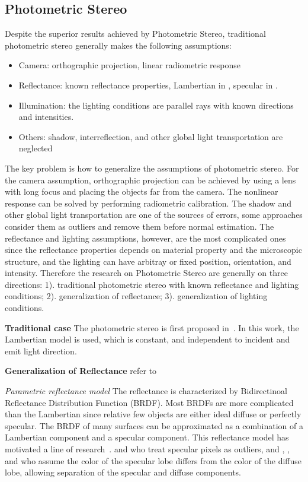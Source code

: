 \subsection{Photometric Stereo}
Despite the superior results achieved by Photometric Stereo,  traditional photometric stereo generally makes the following assumptions:
\begin{itemize}
\item Camera: orthographic projection, linear radiometric response
\item Reflectance: known reflectance properties, \eg Lambertian in \cite{woodham1980photometric}, specular in \cite{}.
\item Illumination: the lighting conditions are parallel rays with known directions and intensities.
\item Others: shadow, interreflection, and other global light transportation are neglected
\end{itemize}

The key problem is how to generalize the assumptions of photometric stereo. For the camera assumption, orthographic projection can be achieved by using a lens with long focus and placing the objects far from the camera. The nonlinear response can be solved by performing radiometric calibration. The shadow and other global light transportation are one of the sources of errors, some approaches consider them as outliers and remove them before normal estimation. The reflectance and lighting assumptions, however, are the most complicated ones since the reflectance properties depends on material property and the microscopic structure, and the lighting can have arbitray or fixed position, orientation, and intensity. Therefore the research on Photometric Stereo are generally on three directions: 1). traditional photometric stereo with known reflectance and lighting conditions; 2). generalization of reflectance; 3). generalization of lighting conditions.

\textbf{Traditional case} The photometric stereo is first proposed in~\cite{woodham1980photometric}. In this work, the Lambertian model is used, which is constant, and independent to incident and emit light direction.

\textbf{Generalization of Reflectance}
refer to \cite{alldrin2008photometric}

\textit{Parametric reflectance model} The reflectance is characterized by Bidirectinoal Reflectance Distribution Function (BRDF). Most BRDFs are more complicated than the Lambertian since relative few objects are either ideal diffuse or perfectly specular. The BRDF of many surfaces can be approximated as a combination of a Lambertian component and a specular component. This reflectance model has motiva{}ted a line of research~\cite{barsky20034,coleman1982obtaining,nayar1990determining}. \citeauthor{coleman1982obtaining} and \citeauthor{barsky20034} who treat specular pixels as outliers, and \citeauthor{schluns1993photometric}, \citeauthor{sato1994temporal}, and \citeauthor{mallick2005beyond} who assume the color of the specular lobe differs from the color of the diffuse lobe, allowing separation of the specular and diffuse components.

